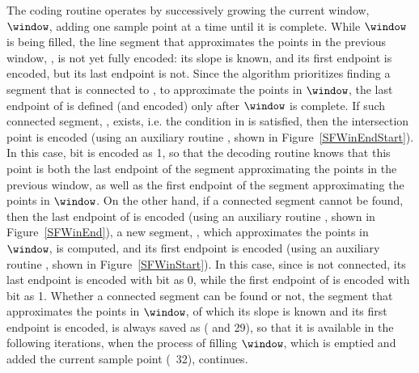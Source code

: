 \vspace{-2pt}



\vspace{-3pt}
The coding routine operates by successively growing the current window, $\window$, adding one sample point at a time until it is complete. While $\window$ is being filled, the line segment that approximates the points in the previous window, \segmentLastT, is not yet fully encoded: its slope is known, and its first endpoint is encoded, but its last endpoint is not. Since the algorithm prioritizes finding a segment that is connected to \segmentLastT, to approximate the points in $\window$, the last endpoint of \segmentLastT is defined (and encoded) only after $\window$ is complete. If such connected segment, \segmentConnT, exists, i.e. the condition in  is satisfied, then the intersection point is encoded (using an auxiliary routine \SFEncodeWinEndStart, shown in Figure~\ref{SFWinEndStart}). In this case, bit \connectedS is encoded as 1, so that the decoding routine knows that this point is both the last endpoint of the segment approximating the points in the previous window, as well as the first endpoint of the segment approximating the points in $\window$. On the other hand, if a connected segment cannot be found, then the last endpoint of \segmentLastT is encoded (using an auxiliary routine \SFWinEndP, shown in Figure~\ref{SFWinEnd}), a new segment, \segmentS, which approximates the points in $\window$, is computed, and its first endpoint is encoded (using an auxiliary routine \SFWinStart, shown in Figure~\ref{SFWinStart}). In this case, since \segmentLastT is not connected, its last endpoint is encoded with bit \connectedS as 0, while the first endpoint of \segmentS is encoded with bit \connectedS as 1. Whether a connected segment can be found or not, the segment that approximates the points in $\window$, of which its slope is known and its first endpoint is encoded, is always saved as \segmentLastT ( and 29), so that it is available in the following iterations, when the process of filling $\window$, which is emptied and added the current sample point (\Line~32), continues.


\vspace{-2pt}


\clearpage




\vspace{-5pt}



